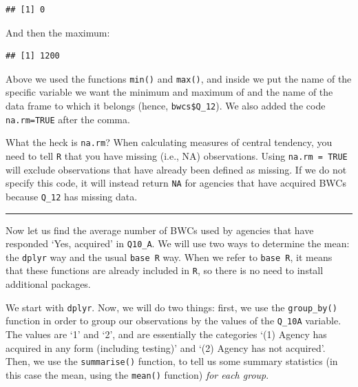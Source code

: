 \documentclass[
]{book}
\newenvironment{Shaded}{\begin{snugshade}}{\end{snugshade}}
\newcommand{\AttributeTok}[1]{\textcolor[rgb]{0.77,0.63,0.00}{#1}}
\newcommand{\ConstantTok}[1]{\textcolor[rgb]{0.00,0.00,0.00}{#1}}
\newcommand{\FunctionTok}[1]{\textcolor[rgb]{0.00,0.00,0.00}{#1}}
\newcommand{\NormalTok}[1]{#1}
\newcommand{\SpecialCharTok}[1]{\textcolor[rgb]{0.00,0.00,0.00}{#1}}
\begin{document}
\begin{verbatim}
## [1] 0
\end{verbatim}

And then the maximum:

\begin{Shaded}
\end{Shaded}

\begin{verbatim}
## [1] 1200
\end{verbatim}

Above we used the functions \texttt{min()} and \texttt{max()}, and inside we put the name of the specific variable we want the minimum and maximum of and the name of the data frame to which it belongs (hence, \texttt{bwcs\$Q\_12}). We also added the code \texttt{na.rm=TRUE} after the comma.

What the heck is \texttt{na.rm}? When calculating measures of central tendency, you need to tell \texttt{R} that you have missing (i.e., NA) observations. Using \texttt{na.rm\ =\ TRUE} will exclude observations that have already been defined as missing. If we do not specify this code, it will instead return \texttt{NA} for agencies that have acquired BWCs because \texttt{Q\_12} has missing data.

\begin{center}\rule{0.5\linewidth}{0.5pt}\end{center}

Now let us find the average number of BWCs used by agencies that have responded `Yes, acquired' in \texttt{Q10\_A}. We will use two ways to determine the mean: the \texttt{dplyr} way and the usual \texttt{base\ R} way. When we refer to \texttt{base\ R}, it means that these functions are already included in \texttt{R}, so there is no need to install additional packages.

We start with \texttt{dplyr}. Now, we will do two things: first, we use the \texttt{group\_by()} function in order to group our observations by the values of the \texttt{Q\_10A} variable. The values are `1' and `2', and are essentially the categories `(1) Agency has acquired in any form (including testing)' and `(2) Agency has not acquired'. Then, we use the \texttt{summarise()} function, to tell us some summary statistics (in this case the mean, using the \texttt{mean()} function) \emph{for each group}.
\end{document}
